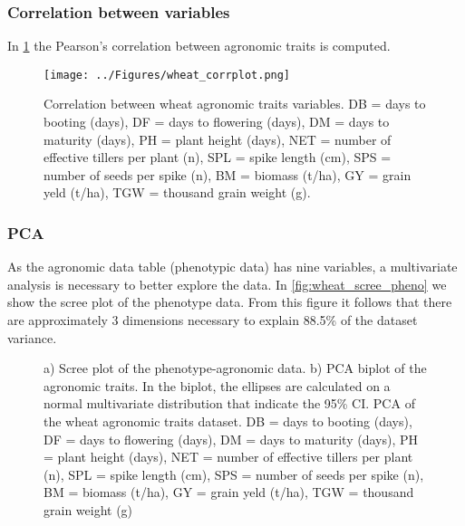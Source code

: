 \documentclass[a4paper,onecolumn,10pt]{article}
\begin{document}
\subsubsection{Correlation between variables}

In \cref{fig:wheat_corr} the Pearson's correlation between agronomic traits is computed.

\begin{figure}[!ht]
    \centering
    \texttt{[image: ../Figures/wheat\_corrplot.png]}
    \caption{
        Correlation between wheat agronomic traits variables.
        DB = days to booting (days),
        DF = days to flowering (days),
        DM = days to maturity (days),
        PH = plant height (days),
        NET = number of effective tillers per plant (n),
        SPL = spike length (cm),
        SPS = number of seeds per spike (n),
        BM = biomass (t/ha),
        GY = grain yeld (t/ha),
        TGW = thousand grain weight (g).
    }
    \label{fig:wheat_corr}
\end{figure}



\subsubsection{PCA}

As the agronomic data table (phenotypic data) has nine variables, a multivariate analysis is necessary to better explore the data.
In \cref{fig:wheat_scree_pheno} we show the scree plot of the phenotype data.
From this figure it follows that there are approximately 3 dimensions necessary to explain 88.5\% of the dataset variance.

\begin{figure}[!ht]
    \centering
    \caption{
        a) Scree plot of the phenotype-agronomic data.
        b) PCA biplot of the agronomic traits.
        In the biplot, the ellipses are calculated on a normal multivariate distribution that indicate the 95\% CI.
        PCA of the wheat agronomic traits dataset.
        DB = days to booting (days),
        DF = days to flowering (days),
        DM = days to maturity (days),
        PH = plant height (days),
        NET = number of effective tillers per plant (n),
        SPL = spike length (cm),
        SPS = number of seeds per spike (n),
        BM = biomass (t/ha),
        GY = grain yeld (t/ha),
        TGW = thousand grain weight (g)}
    \label{fig:scree_PCA_location}
\end{figure}

\newpage



\end{document}
